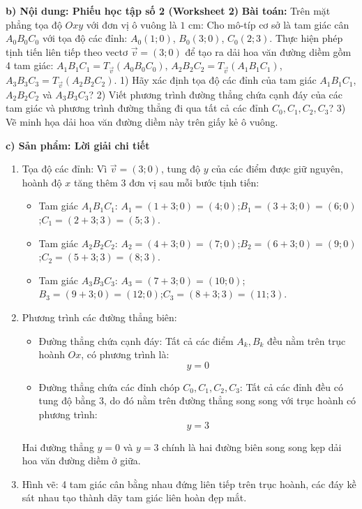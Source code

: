\documentclass[12pt, a4paper]{article}
\renewcommand{\vec}[1]{\overrightarrow{#1}}
\begin{document}
\noindent \textbf{b) Nội dung: Phiếu học tập số 2 (Worksheet 2)}  
\textbf{Bài toán:} Trên mặt phẳng tọa độ $Oxy$ với đơn vị ô vuông là $1\text{ cm}$:  
Cho mô-típ cơ sở là tam giác cân $A_0 B_0 C_0$ với tọa độ các đỉnh: $A_0(1; 0)$, $B_0(3; 0)$, $C_0(2; 3)$.  
Thực hiện phép tịnh tiến liên tiếp theo vectơ $\vec{v} = (3; 0)$ để tạo ra dải hoa văn đường diềm gồm 4 tam giác:  
$A_1 B_1 C_1 = T_{\vec{v}}(A_0 B_0 C_0)$, $A_2 B_2 C_2 = T_{\vec{v}}(A_1 B_1 C_1)$, $A_3 B_3 C_3 = T_{\vec{v}}(A_2 B_2 C_2)$.  
1) Hãy xác định tọa độ các đỉnh của tam giác $A_1 B_1 C_1$, $A_2 B_2 C_2$ và $A_3 B_3 C_3$?  
2) Viết phương trình đường thẳng chứa cạnh đáy của các tam giác và phương trình đường thẳng đi qua tất cả các đỉnh $C_0, C_1, C_2, C_3$?  
3) Vẽ minh họa dải hoa văn đường diềm này trên giấy kẻ ô vuông.  
  
\noindent \textbf{c) Sản phẩm: Lời giải chi tiết}  
\begin{enumerate}[leftmargin=0.6cm]  
    \item Tọa độ các đỉnh: Vì $\vec{v} = (3; 0)$, tung độ $y$ của các điểm được giữ nguyên, hoành độ $x$ tăng thêm $3$ đơn vị sau mỗi bước tịnh tiến:  
    \begin{itemize}  
        \item Tam giác $A_1 B_1 C_1$:  
        $A_1 = (1 + 3; 0) = (4; 0)$;\quad $B_1 = (3 + 3; 0) = (6; 0)$;\quad $C_1 = (2 + 3; 3) = (5; 3)$.  
        \item Tam giác $A_2 B_2 C_2$:  
        $A_2 = (4 + 3; 0) = (7; 0)$;\quad $B_2 = (6 + 3; 0) = (9; 0)$;\quad $C_2 = (5 + 3; 3) = (8; 3)$.  
        \item Tam giác $A_3 B_3 C_3$:  
        $A_3 = (7 + 3; 0) = (10; 0)$;\quad $B_3 = (9 + 3; 0) = (12; 0)$;\quad $C_3 = (8 + 3; 3) = (11; 3)$.  
    \end{itemize}  
    \item Phương trình các đường thẳng biên:  
    \begin{itemize}  
        \item Đường thẳng chứa cạnh đáy: Tất cả các điểm $A_k, B_k$ đều nằm trên trục hoành $Ox$, có phương trình là:  
        $$y = 0$$  
        \item Đường thẳng chứa các đỉnh chóp $C_0, C_1, C_2, C_3$: Tất cả các đỉnh đều có tung độ bằng $3$, do đó nằm trên đường thẳng song song với trục hoành có phương trình:  
        $$y = 3$$  
    \end{itemize}  
    Hai đường thẳng $y = 0$ và $y = 3$ chính là hai đường biên song song kẹp dải hoa văn đường diềm ở giữa.  
    \item Hình vẽ: 4 tam giác cân bằng nhau đứng liên tiếp trên trục hoành, các đáy kề sát nhau tạo thành dãy tam giác liên hoàn đẹp mắt.  
\end{enumerate}  
  
\end{document}
